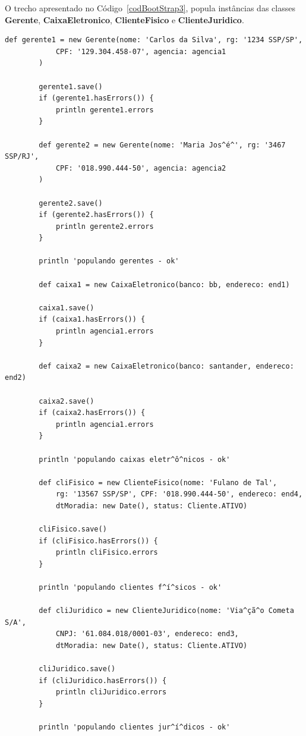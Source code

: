 \newpage


O  trecho  apresentado  no  Código~\ref{codBootStrap3},  popula  instâncias  das
classes  {\bf  Gerente},  {\bf  CaixaEletronico},  {\bf  ClienteFisico}  e  {\bf
  ClienteJuridico}. 

\begin{lstlisting}[caption={\bf BootStrap.groovy (3)}, frame = trBL, float=htbp,
    label=codBootStrap3]
        def gerente1 = new Gerente(nome: 'Carlos da Silva', rg: '1234 SSP/SP',
            CPF: '129.304.458-07', agencia: agencia1
        )
    
        gerente1.save()
        if (gerente1.hasErrors()) {
            println gerente1.errors
        }
        
        def gerente2 = new Gerente(nome: 'Maria Jos^é^', rg: '3467 SSP/RJ',
            CPF: '018.990.444-50', agencia: agencia2
        )
    
        gerente2.save()
        if (gerente2.hasErrors()) {
            println gerente2.errors
        }
        
        println 'populando gerentes - ok'
        
        def caixa1 = new CaixaEletronico(banco: bb, endereco: end1)
        
        caixa1.save()
        if (caixa1.hasErrors()) {
            println agencia1.errors
        }
        
        def caixa2 = new CaixaEletronico(banco: santander, endereco: end2)
        
        caixa2.save()
        if (caixa2.hasErrors()) {
            println agencia1.errors
        }
        
        println 'populando caixas eletr^ô^nicos - ok'
        
        def cliFisico = new ClienteFisico(nome: 'Fulano de Tal', 
            rg: '13567 SSP/SP', CPF: '018.990.444-50', endereco: end4,
            dtMoradia: new Date(), status: Cliente.ATIVO) 
        
        cliFisico.save()
        if (cliFisico.hasErrors()) {
            println cliFisico.errors
        }
        
        println 'populando clientes f^í^sicos - ok'
                
        def cliJuridico = new ClienteJuridico(nome: 'Via^çã^o Cometa S/A', 
            CNPJ: '61.084.018/0001-03', endereco: end3,
            dtMoradia: new Date(), status: Cliente.ATIVO) 
        
        cliJuridico.save()
        if (cliJuridico.hasErrors()) {
            println cliJuridico.errors
        }
        
        println 'populando clientes jur^í^dicos - ok'
\end{lstlisting}

